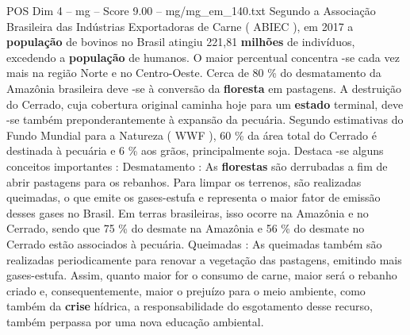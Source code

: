 \begin{textsample}{POS Dim 4 – mg – Score 9.00 – mg/mg\_em\_140.txt}
Segundo a Associação Brasileira das Indústrias Exportadoras de Carne ( ABIEC ), em 2017 a \textbf{população} de bovinos no Brasil atingiu 221,81 \textbf{milhões} de indivíduos, excedendo a \textbf{população} de humanos.
O maior percentual concentra -se cada vez mais na região Norte e no Centro-Oeste.
Cerca de 80 \% do desmatamento da Amazônia brasileira deve -se à conversão da \textbf{floresta} em pastagens.
A destruição do Cerrado, cuja cobertura original caminha hoje para um \textbf{estado} terminal, deve -se também preponderantemente à expansão da pecuária.
Segundo estimativas do Fundo Mundial para a Natureza ( WWF ), 60 \% da área total do Cerrado é destinada à pecuária e 6 \% aos grãos, principalmente soja.
Destaca -se alguns conceitos importantes : Desmatamento : As \textbf{florestas} são derrubadas a fim de abrir pastagens para os rebanhos.
Para limpar os terrenos, são realizadas queimadas, o que emite os gases-estufa e representa o maior fator de emissão desses gases no Brasil.
Em terras brasileiras, isso ocorre na Amazônia e no Cerrado, sendo que 75 \% do desmate na Amazônia e 56 \% do desmate no Cerrado estão associados à pecuária.
Queimadas : As queimadas também são realizadas periodicamente para renovar a vegetação das pastagens, emitindo mais gases-estufa.
Assim, quanto maior for o consumo de carne, maior será o rebanho criado e, consequentemente, maior o prejuízo para o meio ambiente, como também da \textbf{crise} hídrica, a responsabilidade do esgotamento desse recurso, também perpassa por uma nova educação ambiental.

\end{textsample}
